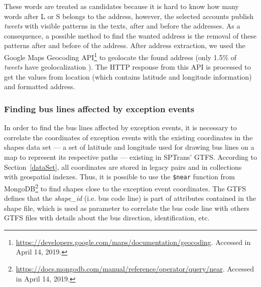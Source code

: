 \documentclass[runningheads]{llncs}
\begin{document}
These words are treated as candidates because it is hard to know how many words after L or S belongs to the address, however, the selected accounts publish \textit{tweets} with visible patterns in the texts, after and before the addresses. As a consequence, a possible method to find the wanted address is the removal of these patterns after and before of the address. After address extraction, we used the Google Maps Geocoding API\footnote{\url{https://developers.google.com/maps/documentation/geocoding}. Accessed in April 14, 2019.} to geolocate the found address (only 1.5\% of \textit{tweets} have geolocalization \cite{niu2016community}).
The HTTP response from this API is processed to get the values from location (which contains latitude and longitude information) and formatted address.


\subsubsection{Finding bus lines affected by exception events}

In order to find the bus lines affected by exception events, it is necessary to correlate the coordinates of exception events with the existing coordinates in the shapes data set --- a set of latitude and longitude used for drawing bus lines on a map to represent its respective paths --- existing in SPTrans' GTFS. According to Section~\ref{dataSet}, all coordinates are stored in legacy pairs and in collections with geospatial indexes. Thus, it is possible to use the \texttt{\$near} function from MongoDB\footnote{\url{https://docs.mongodb.com/manual/reference/operator/query/near}. Accessed in April 14, 2019.} to find shapes close to the exception event coordinates. The GTFS defines that the \textit{shape\_id} (i.e. bus code line) is part of attributes contained in the shape file, which is used as parameter to correlate the bus code line with others GTFS files with details about the bus direction, identification, etc.
\end{document}
